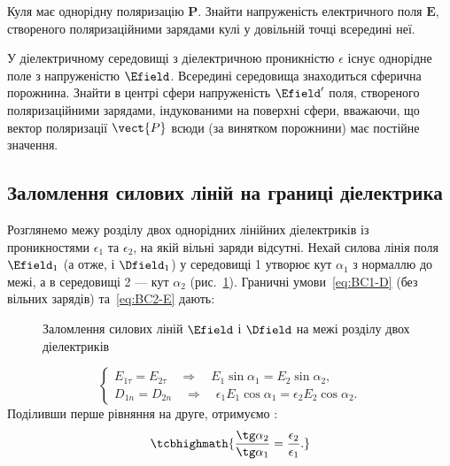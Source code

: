 \begin{problem}
Куля має однорідну поляризацію $\mathbf{P}$. Знайти напруженість електричного поля $\mathbf{E}$, створеного поляризаційними зарядами кулі у довільній точці всередині неї.
\end{problem}

\begin{problem}\label{prb:hole_in_dielectric}
У діелектричному середовищі з діелектричною проникністю $\epsilon$ існує однорідне поле з напруженістю $\Efield$. Всередині середовища знаходиться сферична порожнина. Знайти в центрі сфери напруженість $\Efield'$ поля, створеного поляризаційними зарядами, індукованими на поверхні сфери, вважаючи, що вектор поляризації $\vect{P}$ всюди (за винятком порожнини) має постійне значення.
\end{problem}

\subsection*{Заломлення силових ліній на границі діелектрика}

Розглянемо межу розділу двох однорідних лінійних діелектриків із проникностями $\epsilon_1$ та $\epsilon_2$, на якій вільні заряди відсутні. Нехай
силова лінія поля $\Efield_1$ (а отже, і $\Dfield_1$) у середовищі 1 утворює кут $\alpha_1$ з нормаллю до межі, а в середовищі 2 --- кут $\alpha_2$
(рис.~\ref{pic:Refraction}).
Граничні умови~\eqref{eq:BC1-D} (без вільних зарядів) та~\eqref{eq:BC2-E} дають:

\begin{figure}[h!]\centering
	\caption{Заломлення силових ліній $\Efield$ і $\Dfield$ на межі розділу двох
		діелектриків\label{pic:Refraction}}
\end{figure}
\begin{equation*}
	\begin{cases}
		E_{1\tau} = E_{2\tau} \quad\Longrightarrow\quad E_1\sin\alpha_1 = E_2\sin\alpha_2, \\
		D_{1n} = D_{2n} \quad\Longrightarrow\quad \epsilon_1 E_1\cos\alpha_1 = \epsilon_2 E_2\cos\alpha_2.
	\end{cases}
\end{equation*}
Поділивши перше рівняння на друге, отримуємо :
\begin{equation}\label{eq:Refraction}
	\tcbhighmath{
		\frac{\tg\alpha_2}{\tg\alpha_1} = \frac{\epsilon_2}{\epsilon_1}.
	}
\end{equation}

